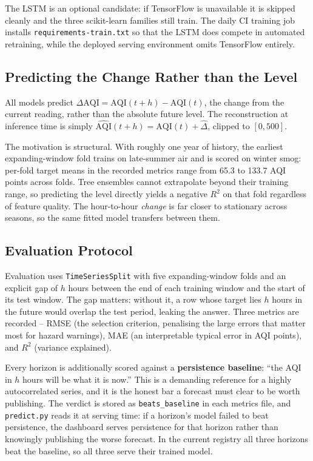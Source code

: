 \documentclass[11pt,a4paper]{article}
\begin{document}
The LSTM is an optional candidate: if TensorFlow is unavailable it is skipped
cleanly and the three scikit-learn families still train. The daily CI training
job installs \texttt{requirements-train.txt} so that the LSTM does compete in
automated retraining, while the deployed serving environment omits TensorFlow
entirely.

\subsection{Predicting the Change Rather than the Level}
\label{sec:delta}

All models predict $\Delta\text{AQI} = \text{AQI}(t+h) - \text{AQI}(t)$, the
change from the current reading, rather than the absolute future level. The
reconstruction at inference time is simply
$\widehat{\text{AQI}}(t+h) = \text{AQI}(t) + \widehat{\Delta}$, clipped to
$[0, 500]$.

The motivation is structural. With roughly one year of history, the earliest
expanding-window fold trains on late-summer air and is scored on winter smog:
per-fold target means in the recorded metrics range from 65.3 to 133.7 AQI
points across folds. Tree ensembles cannot extrapolate beyond their training
range, so predicting the level directly yields a negative $R^2$ on that fold
regardless of feature quality. The hour-to-hour \emph{change} is far closer to
stationary across seasons, so the same fitted model transfers between them.

\subsection{Evaluation Protocol}

Evaluation uses \texttt{TimeSeriesSplit} with five expanding-window folds and
an explicit gap of $h$ hours between the end of each training window and the
start of its test window. The gap matters: without it, a row whose target lies
$h$ hours in the future would overlap the test period, leaking the answer.
Three metrics are recorded -- RMSE (the selection criterion, penalising the
large errors that matter most for hazard warnings), MAE (an interpretable
typical error in AQI points), and $R^2$ (variance explained).

Every horizon is additionally scored against a \textbf{persistence baseline}:
``the AQI in $h$ hours will be what it is now.'' This is a demanding reference
for a highly autocorrelated series, and it is the honest bar a forecast must
clear to be worth publishing. The verdict is stored as \texttt{beats\_baseline}
in each metrics file, and \texttt{predict.py} reads it at serving time: if a
horizon's model failed to beat persistence, the dashboard serves persistence
for that horizon rather than knowingly publishing the worse forecast. In the
current registry all three horizons beat the baseline, so all three serve their
trained model.
\end{document}
